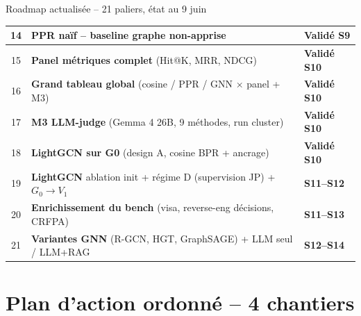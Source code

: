 \documentclass[aspectratio=169,10pt]{beamer}
\begin{document}
\begin{frame}{Roadmap actualisée -- 21 paliers, état au 9 juin}
\begin{center}
\begin{tabular}{@{}c p{8.8cm} l@{}}
    \rowcolor{accentsoft}
    14 & PPR naïf -- baseline graphe non-apprise                                     & \textcolor{ok}{\textbf{Validé S9}} \\
    \midrule
    \rowcolor{accentsoft}
    15 & \textbf{Panel métriques complet} (Hit@K, MRR, NDCG)                         & \textcolor{ok}{\textbf{Validé S10}} \\
    \rowcolor{accentsoft}
    16 & \textbf{Grand tableau global} (cosine / PPR / GNN $\times$ panel + M3)     & \textcolor{ok}{\textbf{Validé S10}} \\
    \rowcolor{accentsoft}
    17 & \textbf{M3 LLM-judge} (Gemma 4 26B, 9 méthodes, run cluster)               & \textcolor{ok}{\textbf{Validé S10}} \\
    \rowcolor{accentsoft}
    18 & \textbf{LightGCN sur G0} (design A, cosine BPR + ancrage)                   & \textcolor{ok}{\textbf{Validé S10}} \\
    \midrule
    \rowcolor{green!10}
    19 & \textbf{LightGCN} ablation init + régime D (supervision JP) + $G_0 \to V_1$    & \textcolor{accent}{\textbf{S11--S12}} \\
    \rowcolor{green!10}
    20 & \textbf{Enrichissement du bench} (visa, reverse-eng décisions, CRFPA)       & \textcolor{accent}{\textbf{S11--S13}} \\
    \rowcolor{green!10}
    21 & \textbf{Variantes GNN} (R-GCN, HGT, GraphSAGE) + LLM seul / LLM+RAG         & \textcolor{accent}{\textbf{S12--S14}} \\
    \bottomrule
  \end{tabular}
  \end{center}
\end{frame}

\section{Plan d'action ordonné -- 4 chantiers}
\end{document}
